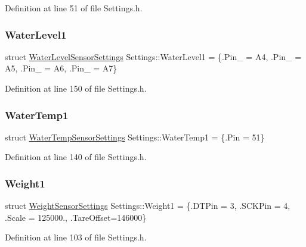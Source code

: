 Definition at line 51 of file Settings.\+h.

\mbox{\label{struct_settings_afe30a825758d27e4c22a3ebcdb662d2f}} 
\subsubsection{\texorpdfstring{Water\+Level1}{WaterLevel1}}
{\footnotesize\ttfamily struct \hyperlink{struct_settings_1_1_water_level_sensor_settings}{Water\+Level\+Sensor\+Settings} Settings\+::\+Water\+Level1 = \{.Pin\+\_ = A4, .Pin\+\_ = A5, .Pin\+\_ = A6, .Pin\+\_ = A7\}}



Definition at line 150 of file Settings.\+h.

\mbox{\label{struct_settings_a28b69b8736968faf69454ce61081abf0}} 
\subsubsection{\texorpdfstring{Water\+Temp1}{WaterTemp1}}
{\footnotesize\ttfamily struct \hyperlink{struct_settings_1_1_water_temp_sensor_settings}{Water\+Temp\+Sensor\+Settings} Settings\+::\+Water\+Temp1 = \{.Pin = 51\}}



Definition at line 140 of file Settings.\+h.

\mbox{\label{struct_settings_a04ff80018a76e8e43ec93b400fdd5175}} 
\subsubsection{\texorpdfstring{Weight1}{Weight1}}
{\footnotesize\ttfamily struct \hyperlink{struct_settings_1_1_weight_sensor_settings}{Weight\+Sensor\+Settings} Settings\+::\+Weight1 = \{.D\+T\+Pin = 3, .S\+C\+K\+Pin = 4, .Scale = 125000., .Tare\+Offset=146000\}}



Definition at line 103 of file Settings.\+h.

\mbox{\label{struct_settings_a2b696b80c3d9680c83b351ecd962299c}} 
